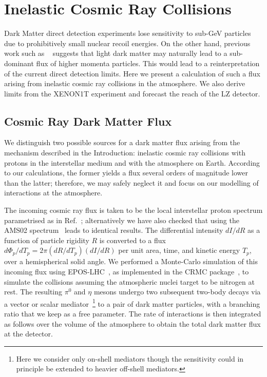 \chapter{Inelastic Cosmic Ray Collisions}\label{chap:cr}

Dark Matter direct detection experiments lose sensitivity to sub-GeV particles due to prohibitively small nuclear recoil energies. On the other hand, previous work such as ~\cite{Bringmann:2018cvk, Ema:2018bih} suggests that light dark matter may naturally lead to a sub-dominant flux of higher momenta particles. This would lead to a reinterpretation of the current direct detection limits. Here we present a calculation of such a flux arising from inelastic cosmic ray collisions in the atmosphere. We also derive limits from the XENON1T experiment and forecast the reach of the LZ detector.

\section{Cosmic Ray Dark Matter Flux}
We distinguish two possible sources for a dark matter flux arising from the mechanism described in the Introduction: inelastic cosmic ray collisions with protons in the interstellar medium and with the atmosphere on Earth. According to our calculations, the former yields a flux several orders of magnitude lower than the latter; therefore, we may safely neglect it and focus on our modelling of interactions at the atmosphere. 

The incoming cosmic ray flux is taken to be the local interstellar proton spectrum parametrised as in Ref.~\cite{Boschini:2017fxq}; alternatively we have also checked that using the AMS02 spectrum~\cite{Consolandi:2014uia} leads to identical results. The differential intensity $dI/dR$ as a function of particle rigidity $R$ is converted to a flux $d\Phi_p / dT_p = 2\pi (dR/dT_p)(dI/dR)$ per unit area, time, and kinetic energy $T_p$, over a hemispherical solid angle. We performed a Monte-Carlo simulation of this incoming flux using EPOS-LHC~\cite{Pierog:2013ria}, as implemented in the CRMC package~\cite{CRMC}, to simulate the collisions assuming the atmospheric nuclei target to be nitrogen at rest. The resulting $\pi^0$ and $\eta$ mesons undergo two subsequent two-body decays via a vector or scalar mediator~\footnote{Here we consider only on-shell mediators though the sensitivity could in principle be extended to heavier off-shell mediators.} to a pair of dark matter particles, with a branching ratio that we keep as a free parameter. The rate of interactions is then integrated as follows over the volume of the atmosphere to obtain the total dark matter flux at the detector. 

